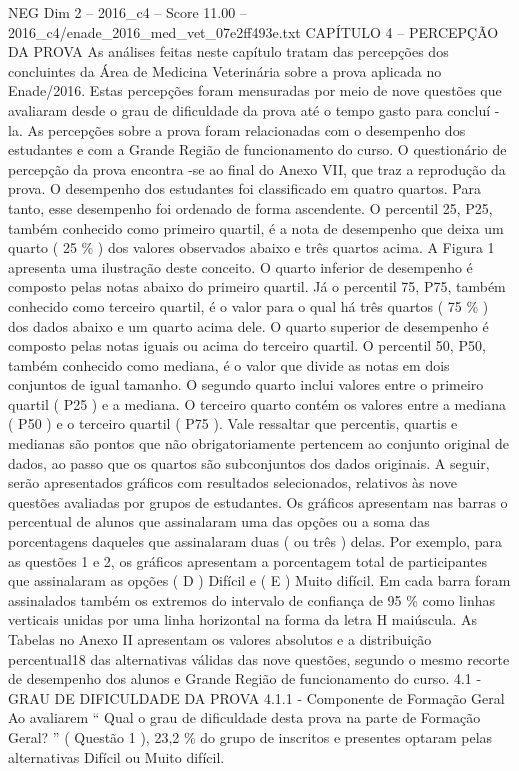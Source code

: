 \begin{textsample}{NEG Dim 2 – 2016\_c4 – Score 11.00 – 2016\_c4/enade\_2016\_med\_vet\_07e2ff493e.txt}  \label{ex:f2_neg_361}
CAPÍTULO 4 – PERCEPÇÃO DA PROVA As análises feitas neste capítulo tratam das percepções dos concluintes da Área de Medicina Veterinária sobre a prova aplicada no Enade/2016.
Estas percepções foram mensuradas por meio de nove questões que avaliaram desde o grau de dificuldade da prova até o tempo gasto para concluí -la.
As percepções sobre a prova foram relacionadas com o desempenho dos estudantes e com a Grande Região de funcionamento do curso.
O questionário de percepção da prova encontra -se ao final do Anexo VII, que traz a reprodução da prova.
O desempenho dos estudantes foi classificado em quatro quartos.
Para tanto, esse desempenho foi ordenado de forma ascendente.
O percentil 25, P25, também conhecido como primeiro quartil, é a nota de desempenho que deixa um quarto ( 25 \% ) dos valores observados abaixo e três quartos acima.
A Figura 1 apresenta uma ilustração deste conceito.
O quarto inferior de desempenho é composto pelas notas abaixo do primeiro quartil.
Já o percentil 75, P75, também conhecido como terceiro quartil, é o valor para o qual há três quartos ( 75 \% ) dos dados abaixo e um quarto acima dele.
O quarto superior de desempenho é composto pelas notas iguais ou acima do terceiro quartil.
O percentil 50, P50, também conhecido como mediana, é o valor que divide as notas em dois conjuntos de igual tamanho.
O segundo quarto inclui valores entre o primeiro quartil ( P25 ) e a mediana.
O terceiro quarto contém os valores entre a mediana ( P50 ) e o terceiro quartil ( P75 ).
Vale ressaltar que percentis, quartis e medianas são pontos que não obrigatoriamente pertencem ao conjunto original de dados, ao passo que os quartos são subconjuntos dos dados originais.
A seguir, serão apresentados gráficos com resultados selecionados, relativos às nove questões avaliadas por grupos de estudantes.
Os gráficos apresentam nas barras o percentual de alunos que assinalaram uma das opções ou a soma das porcentagens daqueles que assinalaram duas ( ou três ) delas.
Por exemplo, para as questões 1 e 2, os gráficos apresentam a porcentagem total de participantes que assinalaram as opções ( D ) Difícil e ( E ) Muito difícil.
Em cada barra foram assinalados também os extremos do intervalo de confiança de 95 \% como linhas verticais unidas por uma linha horizontal na forma da letra H maiúscula.
As Tabelas no Anexo II apresentam os valores absolutos e a distribuição percentual18 das alternativas válidas das nove questões, segundo o mesmo recorte de desempenho dos alunos e Grande Região de funcionamento do curso. 4.1 - GRAU DE DIFICULDADE DA PROVA 4.1.1 - Componente de Formação Geral Ao avaliarem “ Qual o grau de dificuldade desta prova na parte de Formação Geral? ” ( Questão 1 ), 23,2 \% do grupo de inscritos e presentes optaram pelas alternativas Difícil ou Muito difícil.

\end{textsample}
